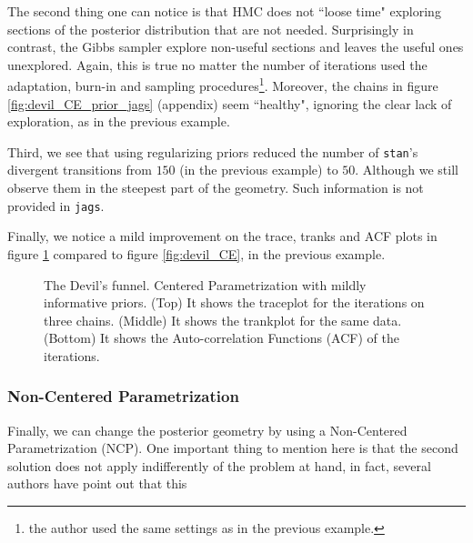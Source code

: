 The second thing one can notice is that HMC does not ``loose time" exploring sections of the posterior distribution that are not needed. Surprisingly in contrast, the Gibbs sampler explore non-useful sections and leaves the useful ones unexplored. Again, this is true no matter the number of iterations used the adaptation, burn-in and sampling procedures\footnote{the author used the same settings as in the previous example.}. Moreover, the chains in figure \ref{fig:devil_CE_prior_jags} (appendix) seem ``healthy", ignoring the clear lack of exploration, as in the previous example.

Third, we see that using regularizing priors reduced the number of \texttt{stan}'s divergent transitions from $150$ (in the previous example) to $50$. Although we still observe them in the steepest part of the geometry. Such information is not provided in \texttt{jags}.

Finally, we notice a mild improvement on the trace, tranks and ACF plots in figure \ref{fig:devil_prior} compared to figure \ref{fig:devil_CE}, in the previous example.
%
\begin{figure}[h] 
	\centering
	\begin{subfigure}
		\texttt{[image: 2\_trace\_CE\_priors]}
	\end{subfigure}
	\begin{subfigure}
		\texttt{[image: 2\_trank\_CE\_priors]}
	\end{subfigure}
	\begin{subfigure}
		\texttt{[image: 2\_acf\_CE\_priors]}
	\end{subfigure}
	\caption[The Devil's funnel. Centered Parametrization with prior information.]%
	{The Devil's funnel. Centered Parametrization with mildly informative priors. (Top) It shows the traceplot for the iterations on three chains. (Middle) It shows the trankplot for the same data. (Bottom) It shows the Auto-correlation Functions (ACF) of the iterations.}
	\label{fig:devil_prior}
\end{figure}


\subsubsection{Non-Centered Parametrization}

Finally, we can change the posterior geometry by using a Non-Centered Parametrization (NCP). One important thing to mention here is that the second solution does not apply indifferently of the problem at hand, in fact, several authors have point out that this 


